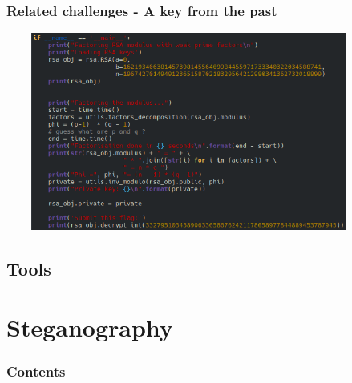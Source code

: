 \documentclass[]{beamer}
\begin{document}
\begin{frame}
\frametitle{Related challenges - A key from the past}
\begin{center}
    \includegraphics[height=6.5cm, width=12.0cm]{./images/RSA-weak-prime-factors.png}
\end{center}
\end{frame}




\subsection{Tools}



%
%
\section{Steganography}
\begin{frame}
    \frametitle{Contents}
    \begin{columns}[t]
        \begin{column}{5cm}
            \tableofcontents[sections={1-2}, currentsection, hideothersubsections]
        \end{column}
        \begin{column}{5cm}
            \tableofcontents[sections={3-4}, currentsection, hideothersubsections]
        \end{column}
    \end{columns}
\end{frame}
\end{document}
